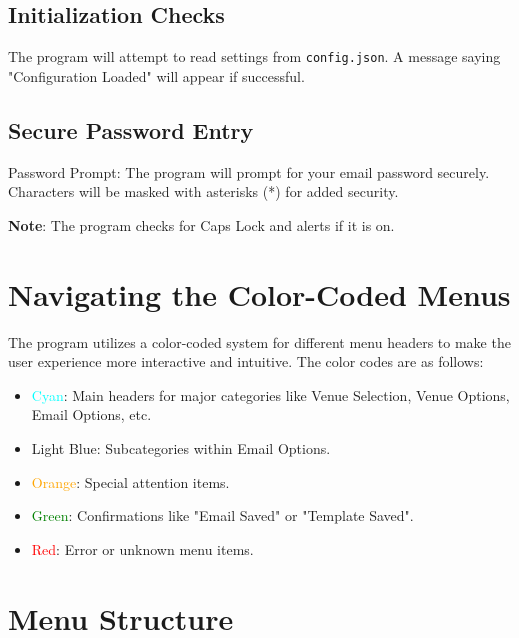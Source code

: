 \documentclass{article}
\begin{document}
	\subsection{Initialization Checks}
	
	The program will attempt to read settings from \texttt{config.json}. A message saying "Configuration Loaded" will appear if successful.
	
	\subsection{Secure Password Entry}
	
	Password Prompt: The program will prompt for your email password securely. Characters will be masked with asterisks (*) for added security.
	
	\textbf{Note}: The program checks for Caps Lock and alerts if it is on.
	
	\section{Navigating the Color-Coded Menus}
	
	The program utilizes a color-coded system for different menu headers to make the user experience more interactive and intuitive. The color codes are as follows:
	
	\begin{itemize}
		\item \textcolor{cyan}{Cyan}: Main headers for major categories like Venue Selection, Venue Options, Email Options, etc.
		\item \textcolor{blue!30}{Light Blue}: Subcategories within Email Options.
		\item \textcolor{orange}{Orange}: Special attention items.
		\item \textcolor{green}{Green}: Confirmations like "Email Saved" or "Template Saved".
		\item \textcolor{red}{Red}: Error or unknown menu items.
	\end{itemize}
	
	\section{Menu Structure}
	
\end{document}
